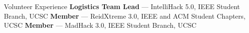 \begin{rubric}{Volunteer Experience}
\entry*[] \textbf{Logistics Team Lead} — IntelliHack 5.0, IEEE Student Branch, UCSC
%
\entry*[] \textbf{Member} — ReidXtreme 3.0, IEEE and ACM Student Chapters, UCSC
%
\entry*[] \textbf{Member} — MadHack 3.0, IEEE Student Branch, UCSC
\end{rubric}